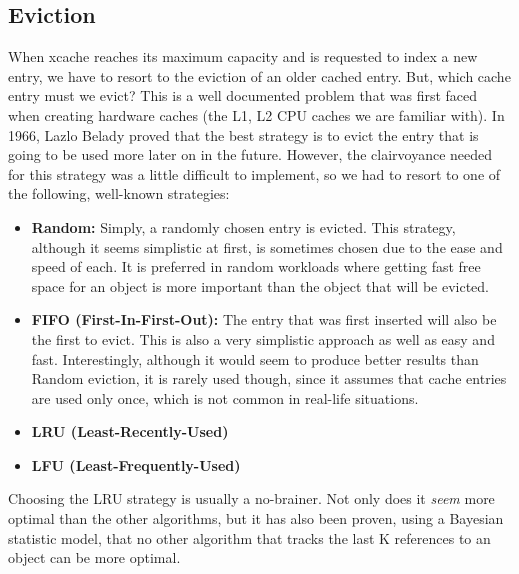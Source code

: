 \subsection{Eviction}

When xcache reaches its maximum capacity and is requested to index a new entry, 
we have to resort to the eviction of an older cached entry. But, which cache 
entry must we evict? This is a well documented problem that was first faced when 
creating hardware caches (the L1, L2 CPU caches we are familiar with). In 1966, 
Lazlo Belady proved that the best strategy is to evict the entry that is going 
to be used more later on in the future\cite{Belady}. However, the clairvoyance 
needed for this strategy was a little difficult to implement, so we had to 
resort to one of the following, well-known strategies:

%
\begin{itemize}
	\item \textbf{Random:} Simply, a randomly chosen entry is evicted. This 
		strategy, although it seems simplistic at first, is sometimes chosen 
		due to the ease and speed of each. It is preferred in random workloads 
		where getting fast free space for an object is more important than the 
		object that will be evicted.
	\item \textbf{FIFO (First-In-First-Out):} The entry that was first inserted 
		will also be the first to evict. This is also a very simplistic 
		approach as well as easy and fast. Interestingly, although it would 
		seem to produce better results than Random eviction, it is rarely used 
		though, since it assumes that cache entries are used only once, which 
		is not common in real-life situations.
	\item \textbf{LRU (Least-Recently-Used)}
	\item \textbf{LFU (Least-Frequently-Used)}
\end{itemize}

Choosing the LRU strategy is usually a no-brainer. Not only does it 
\textit{seem} more optimal than the other algorithms, but it has also been 
proven, using a Bayesian statistic model, that no other algorithm that tracks 
the last K references to an object can be more optimal.

